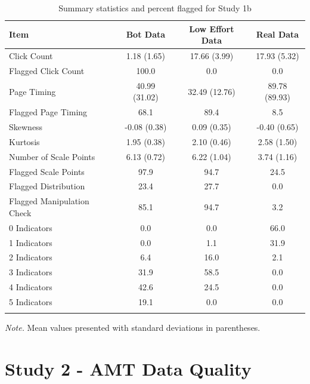 \documentclass[english,man]{apa6}
\theoremstyle{definition}
\theoremstyle{definition}
\theoremstyle{definition}
\theoremstyle{remark}
\begin{document}
\begin{table}[tbp]
\begin{center}
\begin{threeparttable}
\caption{\label{tab:sad-table1}Summary statistics and percent flagged for Study 1b}
\begin{tabular}{lccc}
\toprule
Item & \multicolumn{1}{c}{Bot Data} & \multicolumn{1}{c}{Low Effort Data} & \multicolumn{1}{c}{Real Data}\\
\midrule
Click Count & 1.18 (1.65) & 17.66 (3.99) & 17.93 (5.32)\\
Flagged Click Count & 100.0 & 0.0 & 0.0\\
Page Timing & 40.99 (31.02) & 32.49 (12.76) & 89.78 (89.93)\\
Flagged Page Timing & 68.1 & 89.4 & 8.5\\
Skewness & -0.08 (0.38) & 0.09 (0.35) & -0.40 (0.65)\\
Kurtosis & 1.95 (0.38) & 2.10 (0.46) & 2.58 (1.50)\\
Number of Scale Points & 6.13 (0.72) & 6.22 (1.04) & 3.74 (1.16)\\
Flagged Scale Points & 97.9 & 94.7 & 24.5\\
Flagged Distribution & 23.4 & 27.7 & 0.0\\
Flagged Manipulation Check & 85.1 & 94.7 & 3.2\\
0 Indicators & 0.0 & 0.0 & 66.0\\
1 Indicators & 0.0 & 1.1 & 31.9\\
2 Indicators & 6.4 & 16.0 & 2.1\\
3 Indicators & 31.9 & 58.5 & 0.0\\
4 Indicators & 42.6 & 24.5 & 0.0\\
5 Indicators & 19.1 & 0.0 & 0.0\\
\bottomrule
\addlinespace
\end{tabular}
\begin{tablenotes}[para]
\textit{Note.} Mean values presented with standard deviations in parentheses.
\end{tablenotes}
\end{threeparttable}
\end{center}
\end{table}

\section{Study 2 - AMT Data Quality}\label{study-2---amt-data-quality}
\end{document}
